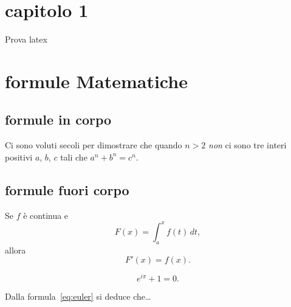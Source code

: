 \documentclass[a4paper]{article}
\begin{document}
\section{capitolo 1}
Prova latex
\section{formule Matematiche}

\subsection{formule in corpo}
Ci sono voluti secoli per
dimostrare che quando $n>2$
\emph{non} ci sono tre interi
positivi $a$, $b$, $c$ tali che $
a^n+b^n=c^n$.

\subsection{formule fuori corpo}

Se $f$ è continua e
\[
F(x)=\int_a^x f(t)\,dt,
\]
allora
\begin{equation}
F'(x)=f(x).
\end{equation}


\begin{equation}
	\label{eq:euler}
		e^{i\pi}+1=0.
	\end{equation}

Dalla formula~\eqref{eq:euler} si deduce che\dots
\end{document}

